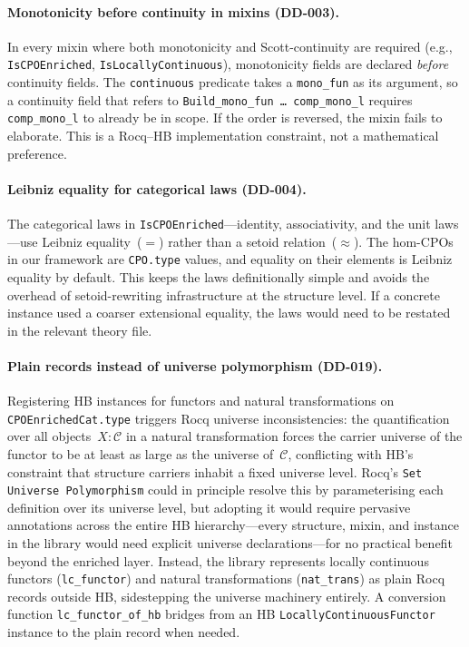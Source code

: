 \paragraph{Monotonicity before continuity in mixins (DD-003).}
In every mixin where both monotonicity and Scott-continuity are required
(e.g., \texttt{IsCPOEnriched}, \texttt{IsLocallyContinuous}), monotonicity
fields are declared \emph{before} continuity fields.  The \texttt{continuous}
predicate takes a \texttt{mono\_fun} as its argument, so a continuity
field that refers to \texttt{Build\_mono\_fun~\ldots~comp\_mono\_l}
requires \texttt{comp\_mono\_l} to already be in scope.  If the order
is reversed, the mixin fails to elaborate.  This is a Rocq--HB
implementation constraint, not a mathematical preference.

\paragraph{Leibniz equality for categorical laws (DD-004).}
The categorical laws in \texttt{IsCPOEnriched}---identity, associativity,
and the unit laws---use Leibniz equality~($=$) rather than a setoid
relation~($\approx$).  The hom-CPOs in our framework are
\texttt{CPO.type} values, and equality on their elements is Leibniz
equality by default.  This keeps the laws definitionally simple and avoids
the overhead of setoid-rewriting infrastructure at the structure level.
If a concrete instance used a coarser extensional equality, the laws
would need to be restated in the relevant theory file.

\paragraph{Plain records instead of universe polymorphism (DD-019).}
Registering HB instances for functors and natural transformations on
\texttt{CPOEnrichedCat.type} triggers Rocq universe inconsistencies:
the quantification over all objects~$X : \mathcal{C}$ in a natural
transformation forces the carrier universe of the functor to be at
least as large as the universe of~$\mathcal{C}$, conflicting with HB's
constraint that structure carriers inhabit a fixed universe level.
Rocq's \texttt{Set Universe Polymorphism} could in principle resolve
this by parameterising each definition over its universe level, but
adopting it would require pervasive annotations across the entire HB
hierarchy---every structure, mixin, and instance in the library would
need explicit universe declarations---for no practical benefit beyond
the enriched layer.  Instead, the library represents locally continuous
functors (\texttt{lc\_functor}) and natural transformations
(\texttt{nat\_trans}) as plain Rocq records outside HB, sidestepping the
universe machinery entirely.  A conversion function
\texttt{lc\_functor\_of\_hb} bridges from an HB
\texttt{LocallyContinuousFunctor} instance to the plain record
when needed.

